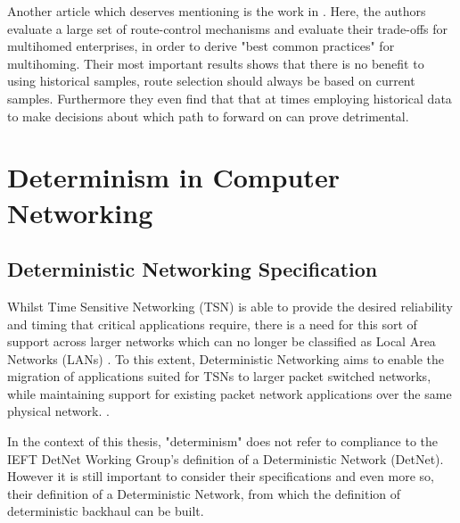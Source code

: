 Another article which deserves mentioning is the work in \cite{akella2008performance}. Here, the authors evaluate a large set of route-control mechanisms and evaluate their trade-offs for multihomed enterprises, in order to derive "best common practices" for multihoming. Their most important results shows that there is no benefit to using historical samples, route selection should always be based on current samples. Furthermore they even find that that at times employing historical data to make decisions about which path to forward on can prove detrimental.


\section{Determinism in Computer Networking}


\subsection{Deterministic Networking Specification}

Whilst Time Sensitive Networking (TSN) is able to provide the desired reliability and timing that critical applications require, there is a need for this sort of support across larger networks which can no longer be classified as Local Area Networks (LANs) \cite{detnet-use-cases, detnet-problem-statement}. To this extent, Deterministic Networking aims to enable the migration of applications suited for TSNs to larger packet switched networks, while maintaining support for existing packet network applications over the same physical network. \cite{detnet-problem-statement}.

In the context of this thesis, "determinism" does not refer to compliance to the IEFT DetNet Working Group's definition of a Deterministic Network (DetNet). However it is still important to consider their specifications and even more so, their definition of a Deterministic Network, from which the definition of deterministic backhaul can be built.

